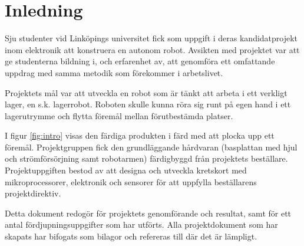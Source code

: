 

\section{Inledning}
Sju studenter vid Linköpings universitet fick som uppgift i deras kandidatprojekt inom elektronik att konstruera en autonom robot. Avsikten med projektet var att ge studenterna bildning i, och erfarenhet av, att genomföra ett omfattande uppdrag med samma metodik som förekommer i arbetslivet.

Projektets mål var att utveckla en robot som är tänkt att arbeta i ett verkligt lager, en s.k. lagerrobot. Roboten skulle kunna röra sig runt på egen hand i ett lagerutrymme och flytta föremål mellan förutbestämda platser.


I figur \ref{fig:intro} visas den färdiga produkten i färd med att plocka upp ett föremål. Projektgruppen fick den grundläggande hårdvaran (basplattan med hjul och strömförsörjning samt robotarmen) färdigbyggd från projektets beställare. Projektuppgiften bestod av att designa och utveckla kretskort med mikroprocessorer, elektronik och sensorer för att uppfylla beställarens projektdirektiv.

Detta dokument redogör för projektets genomförande och resultat, samt för ett antal fördjupningsuppgifter som har utförts. Alla projektdokument som har skapats har bifogats som bilagor och refereras till där det är lämpligt.